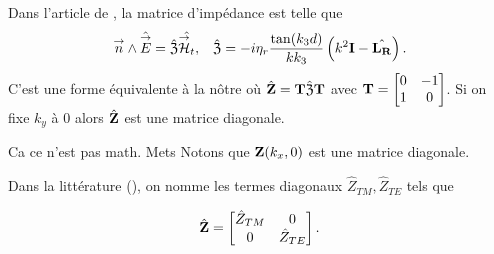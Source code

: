         Dans l'article de \cite{marceaux_high-order_2000}, la matrice d'impédance est telle que
        \begin{align*}
             {\overset{\rightarrow}{n}} \wedge \hat{{\overset{\rightarrow}{E}}} = \hat{\mathfrak{Z}} \hat{{\overset{\rightarrow}{\mathcal{H}}}_t}, && \hat{\mathfrak{Z}} = -i\eta_r\dfrac{\tan(k_3d)}{kk_3}\left(k^2\mathbf{I} - \hat{\mathbf{L_R}}\right).
        \end{align*}
        C'est une forme équivalente à la nôtre où \(\hat{\mathbf{Z}} = \mathbf{T}\hat{\mathfrak{Z}}\mathbf{T}\) avec \(\mathbf{T} = \begin{bmatrix}0&-1\\1&0\end{bmatrix}\).
        Si on fixe \(k_y\) à \(0\) alors \(\hat {\mathbf{Z}}\) est une matrice diagonale.
        \begin{REM}
          Ca ce n'est pas math. Mets Notons que \(\mathbf{Z}(k_x,0)\) est une matrice diagonale.
        \end{REM}
        Dans la littérature (\cite{stupfel_implementation_2015,aubakirov_electromagnetic_2014,hoppe_impedance_1995}), on nomme les termes diagonaux \(\hat Z_{TM}, \hat Z_{TE}\) tels que
        
        \begin{equation*}
            \hat {\mathbf{Z}} =
            \begin{bmatrix}
                \hat Z_{TM} & 0
                \\
                0 & \hat Z_{TE}
            \end{bmatrix}.
        \end{equation*}

